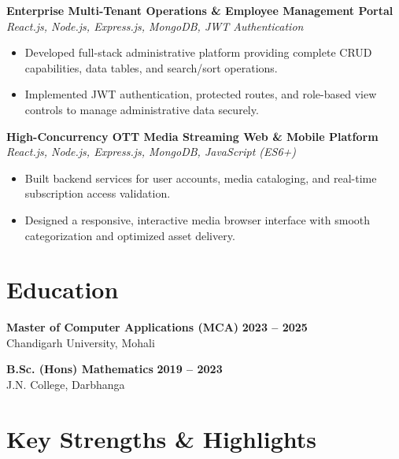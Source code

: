 \documentclass[a4paper,10pt]{article}
\begin{document}
\textbf{Enterprise Multi-Tenant Operations \& Employee Management Portal}
\hfill
\textit{React.js, Node.js, Express.js, MongoDB, JWT Authentication}

\begin{itemize}

    \item Developed full-stack administrative platform providing complete CRUD capabilities, data tables, and search/sort operations.

    \item Implemented JWT authentication, protected routes, and role-based view controls to manage administrative data securely.

\end{itemize}


\textbf{High-Concurrency OTT Media Streaming Web \& Mobile Platform}
\hfill
\textit{React.js, Node.js, Express.js, MongoDB, JavaScript (ES6+)}

\begin{itemize}

    \item Built backend services for user accounts, media cataloging, and real-time subscription access validation.

    \item Designed a responsive, interactive media browser interface with smooth categorization and optimized asset delivery.

\end{itemize}

\section*{Education}

\textbf{Master of Computer Applications (MCA)}
\hfill
\textbf{2023 -- 2025}
\\
Chandigarh University, Mohali

\vspace{3pt}

\textbf{B.Sc. (Hons) Mathematics}
\hfill
\textbf{2019 -- 2023}
\\
J.N. College, Darbhanga

\section*{Key Strengths \& Highlights}
\end{document}
